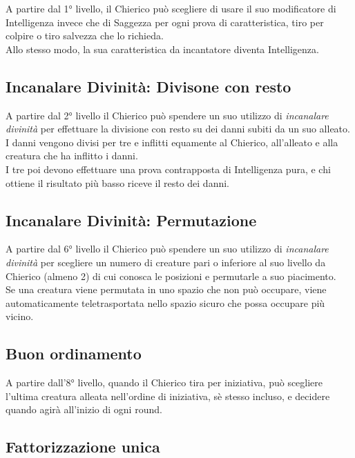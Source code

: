 A partire dal 1° livello, il Chierico può scegliere di usare il suo modificatore di Intelligenza invece che di Saggezza per ogni prova di caratteristica, tiro per colpire o tiro salvezza che lo richieda.\\ Allo stesso modo, la sua caratteristica da incantatore diventa Intelligenza.

\subsection{Incanalare Divinità: Divisone con resto}

A partire dal 2° livello il Chierico può spendere un suo utilizzo di \textit{incanalare divinità} per effettuare la divisione con resto su dei danni subiti da un suo alleato. \\ I danni vengono divisi per tre e inflitti equamente al Chierico, all'alleato e alla creatura che ha inflitto i danni. \\ I tre poi devono effettuare una prova contrapposta di Intelligenza pura, e chi ottiene il risultato più basso riceve il resto dei danni.

\subsection{Incanalare Divinità: Permutazione}

A partire dal 6° livello il Chierico può spendere un suo utilizzo di \textit{incanalare divinità} per scegliere un numero di creature pari o inferiore al suo livello da Chierico (almeno 2) di cui conosca le posizioni e permutarle a suo piacimento. \\ Se una creatura viene permutata in uno spazio che non può occupare, viene automaticamente teletrasportata nello spazio sicuro che possa occupare più vicino.

\subsection{Buon ordinamento}

A partire dall'8° livello, quando il Chierico tira per iniziativa, può scegliere l'ultima creatura alleata nell'ordine di iniziativa, sè stesso incluso, e decidere quando agirà all'inizio di ogni round.

\subsection{Fattorizzazione unica}

